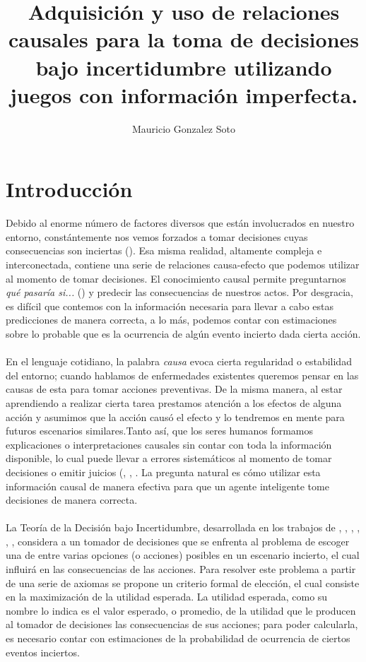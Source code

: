 \documentclass[11pt]{article}
\title{Adquisición y uso de relaciones causales para la toma de decisiones bajo incertidumbre utilizando juegos con información imperfecta.}
\author{Mauricio Gonzalez Soto}
\theoremstyle{plain}
\begin{document}
\maketitle
\tableofcontents
\newpage
\section{Introducción}
Debido al enorme número de factores diversos que están involucrados en nuestro entorno, constántemente nos vemos forzados a tomar decisiones cuyas consecuencias son inciertas (\cite{danks2014unifying}). Esa misma realidad, altamente compleja e interconectada, contiene una serie de relaciones causa-efecto que podemos utilizar al momento de tomar decisiones. El conocimiento causal permite preguntarnos  \textit{qué pasaría si...} (\cite{stalnaker2016knowledge}) y predecir las consecuencias de nuestros actos. Por desgracia, es difícil que contemos con la información necesaria para llevar a cabo estas predicciones de manera correcta, a lo más, podemos contar con estimaciones sobre lo probable que es la ocurrencia de algún evento incierto dada cierta acción.\\
\\
\indent En el lenguaje cotidiano, la palabra \textit{causa} evoca cierta regularidad o estabilidad del entorno; cuando hablamos de enfermedades existentes queremos pensar en las causas de esta para tomar acciones preventivas. De la misma manera, al estar aprendiendo a realizar cierta tarea prestamos atención a los efectos de alguna acción y asumimos que la acción causó el efecto y lo tendremos en mente para futuros escenarios similares.Tanto así, que los seres humanos formamos explicaciones o interpretaciones causales sin contar con toda la información disponible, lo cual puede llevar a errores sistemáticos al momento de tomar decisiones o emitir juicios (\cite{tversky1977causal}, \cite{tversky1980causal}, \cite{kahneman2011thinking}. La pregunta natural es cómo utilizar esta información causal de manera efectiva para que un agente inteligente tome decisiones de manera correcta.\\
\\
\indent La Teoría de la Decisión bajo Incertidumbre, desarrollada en los trabajos de \cite{von1944theory}, \cite{definetti1930}, \cite{definetti1937}, \cite{savage1954the}, \cite{bernardo2000bayesian}, \cite{gilboa2009decision}, considera a un tomador de decisiones que se enfrenta al problema de escoger una de entre varias opciones (o acciones) posibles en un escenario incierto, el cual influirá en las consecuencias de las acciones. Para resolver este problema a partir de una serie de axiomas se propone un criterio formal de elección, el cual consiste en la maximización de la utilidad esperada. La utilidad esperada, como su nombre lo indica es el valor esperado, o promedio, de la utilidad que le producen al tomador de decisiones las consecuencias de sus acciones; para poder calcularla, es necesario contar con estimaciones de la probabilidad de ocurrencia de ciertos eventos inciertos. \\
\end{document}
